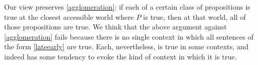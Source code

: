 \documentclass[If.tex]{subfiles}
\begin{document}
Our view preserves \ref{agglomeration}: if each of a certain class of propositions is true at the closest accessible world where $P$ is true, then at that world, all of those propositions are true. We think that the above argument against \ref{agglomeration} fails because there is no single context in which all sentences of the form \ref{lateearly} are true. Each, nevertheless, is true in some contexts, and indeed has some tendency to evoke the kind of context in which it is true.%

\gap\begin{comment}
Given the centrality of CSO to the arguments we have been considering, it is worth addressing a particular kind of putative counterexample to CSO that has been presented in some recent work by Kit Fine. Fine is concerned in the first instance not with CSO but with the principle that logically equivalent sentences can be substituted salva veritate in conditionals. On Fine's view, for example, \ref{simple} is (perhaps) true whereas \ref{disjunctive} is certainly false, despite the fact that its antecedent is logically equivalent to that of \ref{simple}:
\begin{prop}
	\nitem \label{simple}
		If the tree had been dead on Sunday morning, it would have been alive on Saturday afternoon.
	\nitem \label{disjunctive}
		If the tree had been either dead on Sunday morning and not alive on Saturday afternoon, or dead on Sunday morning and alive on Saturday afternoon, it would have been alive on Saturday afternoon.
\end{prop}
These sentences also generate counterexample to CSO, since Fine accepts that the logically equivalent antecedents of \ref{simple} and \ref{disjunctive} are also “counterfactually equivalent” in the sense that \ref{sd} and \ref{ds} are both true:
\begin{prop}
	\nitem \label{sd}
		If the tree had been dead on Sunday morning, it would have been either dead on Sunday morning and not alive on Saturday afternoon or dead on Sunday morning and alive on Saturday afternoon
	\nitem \label{ds}
		If the tree had been either dead on Sunday morning and not alive on Saturday afternoon or dead on Sunday morning and alive on Saturday afternoon, it would have been dead on Sunday morning.
\end{prop}
Fine develops a new kind of model-theoretic semantics for counterfactuals which is capable of validating these judgments. While we don't propose to work through the details of this semantics here, we do wish to draw attention to two of its key features. The first feature is that ‘If $A$ or $B$, $C$’ turn out to be logically equivalent to the conjunction of ‘If $A$, $C$’ and ‘If $B$, $C$’. Thus according to Fine, \ref{disjunctive} entails the obviously false \ref{bad}, whereas \ref{simple} does not:

\end{comment}
\end{document}
